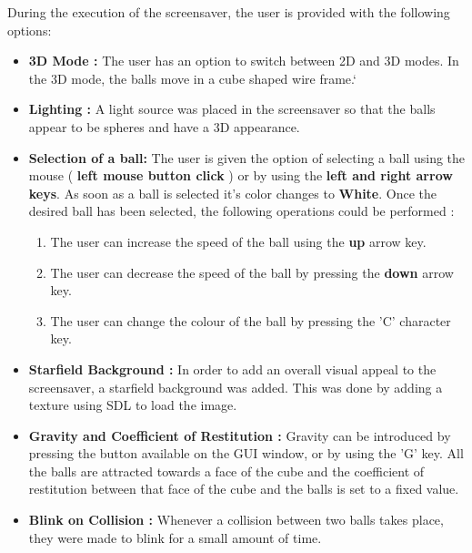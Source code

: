 \documentclass[]{article}
\begin{document}
\begin{flushleft} 

During the execution of the screensaver, the user is provided with the following options:

\begin{itemize}

\item { \bf 3D Mode :} The user has an option to switch between 2D and 3D modes. In the 3D mode, the balls move in a cube shaped wire frame.` 

\item { \bf Lighting :} A light source was placed in the screensaver so that the balls appear to be spheres and have a 3D appearance.

\item \textbf{Selection of a ball:}
The user is given the option of selecting a ball using the mouse ( \textbf{left mouse button click} ) or by using the \textbf{left and right arrow keys}. As soon as a ball is selected it's color changes to \textbf{White}. Once the desired ball has been selected, the following operations could be performed :

\begin{enumerate}

\item The user can increase the speed of the ball using the \textbf{up} arrow key. 

\item The user can decrease the speed of the ball by pressing the \textbf{down} arrow key.

\item The user can change the colour of the ball by pressing the 'C' character key.

\end{enumerate}

\item { \bf Starfield Background :}
In order to add an overall visual appeal to the screensaver, a starfield background was added. This was done by adding a texture using SDL to load the image.

\item { \bf Gravity and Coefficient of Restitution :} Gravity can be introduced by pressing the button available on the GUI window, or by using the 'G' key. All the balls are attracted towards a face of the cube and the coefficient of restitution between that face of the cube and the balls is set to a fixed value.

\item{ \bf Blink on Collision :}
Whenever a collision between two balls takes place, they were made to blink for a small amount of time.


\end{itemize}
\end{flushleft}
\end{document}
